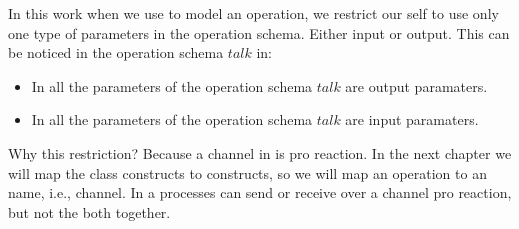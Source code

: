 In this work when we use \oz{} to model an operation, we restrict our self to use only one type of parameters in the operation schema. Either input or output. This can be noticed in the operation schema $talk$ in:
\begin{itemize}
\item In  all the parameters of the operation schema $talk$ are output paramaters.
\item In   all the parameters of the operation schema $talk$ are input paramaters.
\end{itemize}
Why this restriction? Because a channel in \picalc{} is  pro reaction. In the next chapter we will map the \oz{} class constructs to  \picalc{} constructs, so we will map an \oz{} operation to an \picalc{} name, i.e., channel. In \picalc{} a processes can send or receive over a channel pro reaction, but not the both together.